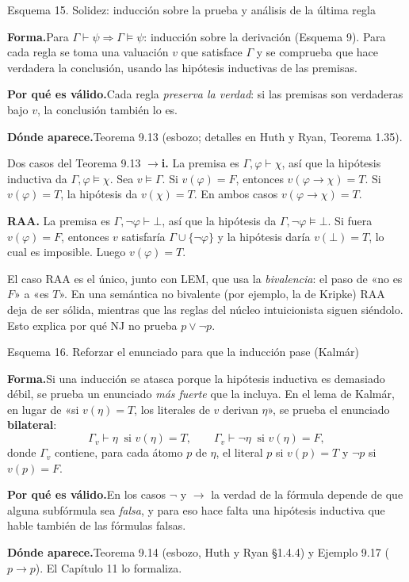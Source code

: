 \documentclass[11pt,a4paper]{article}
\newcommand{\forma}{\par\noindent\textbf{Forma.}\enspace}
\newcommand{\porque}{\par\smallskip\noindent\textbf{Por qué es válido.}\enspace}
\newcommand{\donde}{\par\smallskip\noindent\textbf{Dónde aparece.}\enspace}
\begin{document}
\begin{esquema}{Esquema 15. Solidez: inducción sobre la prueba y análisis de la última regla}
\forma Para \(\Gamma\vdash\psi\Rightarrow\Gamma\vDash\psi\): inducción sobre
la derivación (Esquema 9). Para cada regla se toma una valuación \(v\) que
satisface \(\Gamma\) y se comprueba que hace verdadera la conclusión, usando
las hipótesis inductivas de las premisas.

\porque Cada regla \emph{preserva la verdad}: si las premisas son verdaderas
bajo \(v\), la conclusión también lo es.

\donde Teorema 9.13 (esbozo; detalles en Huth y Ryan, Teorema 1.35).
\end{esquema}

\begin{ejemplotesis}{Dos casos del Teorema 9.13}
\textbf{\(\to\)i.} La premisa es \(\Gamma,\varphi\vdash\chi\), así que la
hipótesis inductiva da \(\Gamma,\varphi\vDash\chi\). Sea \(v\vDash\Gamma\). Si
\(v(\varphi)=F\), entonces \(v(\varphi\to\chi)=T\). Si \(v(\varphi)=T\), la
hipótesis da \(v(\chi)=T\). En ambos casos \(v(\varphi\to\chi)=T\).

\textbf{RAA.} La premisa es \(\Gamma,\neg\varphi\vdash\bot\), así que la
hipótesis da \(\Gamma,\neg\varphi\vDash\bot\). Si fuera \(v(\varphi)=F\),
entonces \(v\) satisfaría \(\Gamma\cup\{\neg\varphi\}\) y la hipótesis daría
\(v(\bot)=T\), lo cual es imposible. Luego \(v(\varphi)=T\).
\end{ejemplotesis}

\begin{trampa}
El caso RAA es el único, junto con LEM, que usa la \emph{bivalencia}: el paso
de «no es \(F\)» a «es \(T\)». En una semántica no bivalente (por ejemplo, la
de Kripke) RAA deja de ser sólida, mientras que las reglas del núcleo
intuicionista siguen siéndolo. Esto explica por qué NJ no prueba \(p\vee\neg p\).
\end{trampa}

\begin{esquema}{Esquema 16. Reforzar el enunciado para que la inducción pase (Kalmár)}
\forma Si una inducción se atasca porque la hipótesis inductiva es demasiado
débil, se prueba un enunciado \emph{más fuerte} que la incluya. En el lema de
Kalmár, en lugar de «si \(v(\eta)=T\), los literales de \(v\) derivan
\(\eta\)», se prueba el enunciado \textbf{bilateral}:
\[
\Gamma_v\vdash\eta\ \text{ si } v(\eta)=T,
\qquad
\Gamma_v\vdash\neg\eta\ \text{ si } v(\eta)=F,
\]
donde \(\Gamma_v\) contiene, para cada átomo \(p\) de \(\eta\), el literal
\(p\) si \(v(p)=T\) y \(\neg p\) si \(v(p)=F\).

\porque En los casos \(\neg\) y \(\to\) la verdad de la fórmula depende de que
alguna subfórmula sea \emph{falsa}, y para eso hace falta una hipótesis
inductiva que hable también de las fórmulas falsas.

\donde Teorema 9.14 (esbozo, Huth y Ryan §1.4.4) y Ejemplo 9.17 (\(p\to p\)).
El Capítulo 11 lo formaliza.
\end{esquema}
\end{document}
